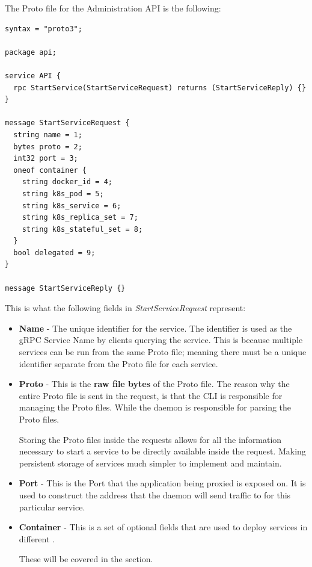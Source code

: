 \documentclass[a4paper,12pt]{report}
\begin{document}
The Proto file for the Administration API is the following:
\begin{lstlisting}
syntax = "proto3";

package api;

service API {
  rpc StartService(StartServiceRequest) returns (StartServiceReply) {}
}

message StartServiceRequest {
  string name = 1;
  bytes proto = 2;
  int32 port = 3;
  oneof container {
    string docker_id = 4;
    string k8s_pod = 5;
    string k8s_service = 6;
    string k8s_replica_set = 7;
    string k8s_stateful_set = 8;
  }
  bool delegated = 9;
}

message StartServiceReply {}
\end{lstlisting}

This is what the following fields in \textit{StartServiceRequest} represent:

\begin{itemize}
    \item \textbf{Name} - The unique identifier for the service. The identifier is used as the gRPC Service Name by clients querying the service.
    This is because multiple services can be run from the same Proto file; meaning there must be a unique identifier separate from the Proto file for each service.
    
    \item \textbf{Proto} - This is the \textbf{raw file bytes} of the Proto file. The reason why the entire Proto file is sent in the request, is that the CLI is responsible for managing the Proto files. While the daemon is responsible for parsing the Proto files.
    
    Storing the Proto files inside the requests allows for all the information necessary to start a service to be directly available inside the request. Making persistent storage of services much simpler to implement and maintain.
    
    \item \textbf{Port} - This is the Port that the application being proxied is exposed on. It is used to construct the address that the daemon will send traffic to for this particular service.
    
    \item \textbf{Container} - This is a set of optional fields that are used to deploy services in different . 
    
    These will be covered in the \textit{} section.
\end{itemize}
\end{document}
